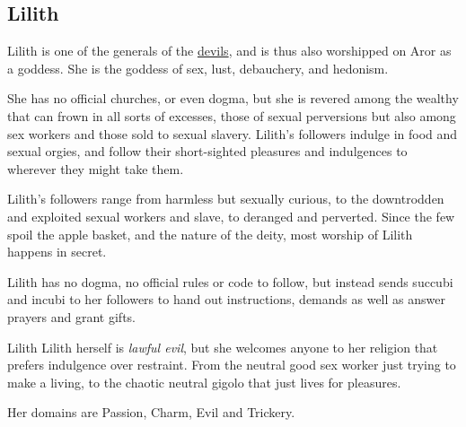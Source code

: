 \subsection{Lilith}
\label{sec:Lilith}

Lilith is one of the generals of the \hyperref[sec:Devils]{devils}, and is
thus also worshipped on Aror as a goddess. She is the goddess of sex, lust,
debauchery, and hedonism.

She has no official churches, or even dogma, but she is revered among the
wealthy that can frown in all sorts of excesses, those of sexual perversions
but also among sex workers and those sold to sexual slavery. Lilith's followers
indulge in food and sexual orgies, and follow their short-sighted pleasures
and indulgences to wherever they might take them.

Lilith's followers range from harmless but sexually curious, to the downtrodden
and exploited sexual workers and slave, to deranged and perverted. Since the
few spoil the apple basket, and the nature of the deity, most worship of Lilith
happens in secret.

Lilith has no dogma, no official rules or code to follow, but instead sends
succubi and incubi to her followers to hand out instructions, demands as well
as answer prayers and grant gifts.

\begin{35e}{Lilith}
  Lilith herself is \emph{lawful evil}, but she welcomes anyone to her religion
  that prefers indulgence over restraint. From the neutral good sex worker just
  trying to make a living, to the chaotic neutral gigolo that just lives for
  pleasures.

  Her domains are Passion, Charm, Evil and Trickery.
\end{35e}
